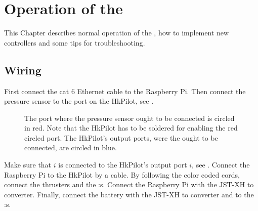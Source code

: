\chapter{Operation of the \abbrROV} \label{app:operation}
This Chapter describes normal operation of the \abbrROV, how to implement new controllers and some tips for troubleshooting.

\section{Wiring} \label{sec:wiring}
First connect the cat 6 Ethernet cable to the Raspberry Pi. Then connect the pressure sensor to the \abbrIC port on the HkPilot, see .
\begin{figure}
\centering
{}
\caption{The \abbrIC port where the pressure sensor ought to be connected is circled in red. Note that the HkPilot has to be soldered for enabling the red circled \abbrIC port. The HkPilot's output ports, were the \abbrESC ought to be connected, are circled in blue.}
\label{fig:i2c}
\end{figure}
Make sure that \abbrESC $i$ is connected to the HkPilot's output port $i$, see . Connect the Raspberry Pi to the HkPilot by a \abbrUSB cable. By following the color coded cords, connect the thrusters and the \abbrESC:s. Connect the Raspberry Pi with the JST-XH to \abbrUSB converter. Finally, connect the battery with the JST-XH to \abbrUSB converter and to the \abbrESC:s.

